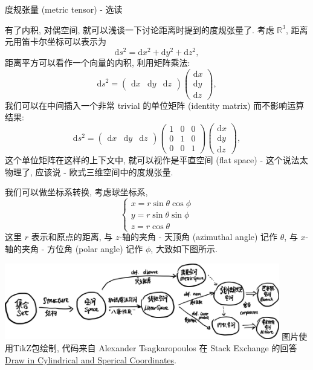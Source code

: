 \begin{newquote}
度规张量 (metric tensor) - 选读

有了内积, 对偶空间, 就可以浅谈一下讨论距离时提到的度规张量了. 考虑
\(\mathbb{R}^3\), 距离元用笛卡尔坐标可以表示为 \[
\mathrm{d}s^2=\mathrm{d}x^2+\mathrm{d}y^2+\mathrm{d}z^2,
\] 距离平方可以看作一个向量的内积, 利用矩阵乘法: \[
\mathrm{d}s^2=\begin{pmatrix}\mathrm{d}x&\mathrm{d}y&\mathrm{d}z\end{pmatrix}\begin{pmatrix}\mathrm{d}x\\\mathrm{d}y\\\mathrm{d}z\end{pmatrix},
\] 我们可以在中间插入一个非常 trivial 的单位矩阵 (identity matrix)
而不影响运算结果: \[
\mathrm{d}s^2=\begin{pmatrix}\mathrm{d}x&\mathrm{d}y&\mathrm{d}z\end{pmatrix}\begin{pmatrix}1&0&0\\0&1&0\\0&0&1\end{pmatrix}\begin{pmatrix}\mathrm{d}x\\\mathrm{d}y\\\mathrm{d}z\end{pmatrix},
\] 这个单位矩阵在这样的上下文中, 就可以视作是平直空间 (flat space) -
这个说法太物理了, 应该说 - 欧式三维空间中的度规张量.

我们可以做坐标系转换, 考虑球坐标系, \[
\begin{cases}
x=r\sin\theta\cos\phi\\
y=r\sin\theta\sin\phi\\
z=r\cos\theta
\end{cases}
\] 这里 \(r\) 表示和原点的距离, 与 \(z\)-轴的夹角 - 天顶角 (azimuthal
angle) 记作 \(\theta\), 与 \(x\)-轴的夹角 - 方位角 (polar angle) 记作
\(\phi\), 大致如下图所示.


\begin{tcolorbox}[size=fbox, breakable, enhanced jigsaw]
  \includegraphics[width=0.9\textwidth]{img/image-20231218171032793.png}
图片使用TikZ包绘制, 代码来自 Alexander Tsagkaropoulos 在 Stack Exchange
的回答
\href{https://tex.stackexchange.com/questions/159445/draw-in-cylindrical-and-\%20spherical-coordinates/159452}{Draw
in Cylindrical and Sperical Coordinates}.
\end{tcolorbox}



\end{newquote}
